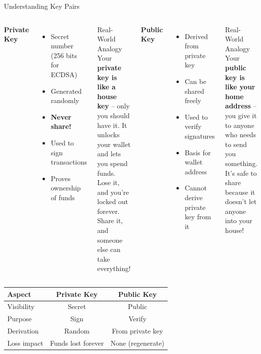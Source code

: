 \documentclass[8pt,aspectratio=169]{beamer}
\begin{document}
\begin{frame}[t]{Understanding Key Pairs}
\begin{columns}[T]
\textbf{Private Key}

\begin{itemize}
\item Secret number (256 bits for ECDSA)
\item Generated randomly
\item \textcolor{mlred}{\textbf{Never share!}}
\item Used to sign transactions
\item Proves ownership of funds
\end{itemize}

\vspace{0.3em}
\begin{block}{Real-World Analogy}
Your \textbf{private key is like a house key} -- only you should have it. It unlocks your wallet and lets you spend funds. Lose it, and you're locked out forever. Share it, and someone else can take everything!
\end{block}

\textbf{Public Key}

\begin{itemize}
\item Derived from private key
\item Can be shared freely
\item Used to verify signatures
\item Basis for wallet address
\item Cannot derive private key from it
\end{itemize}

\vspace{0.3em}
\begin{block}{Real-World Analogy}
Your \textbf{public key is like your home address} -- you give it to anyone who needs to send you something. It's safe to share because it doesn't let anyone into your house!
\end{block}
\end{columns}

\vspace{0.3em}
\begin{center}
\begin{tabular}{lcc}
\toprule
\textbf{Aspect} & \textbf{Private Key} & \textbf{Public Key} \\
\midrule
Visibility & Secret & Public \\
Purpose & Sign & Verify \\
Derivation & Random & From private key \\
Loss impact & Funds lost forever & None (regenerate) \\
\bottomrule
\end{tabular}
\end{center}
\end{frame}
\end{document}
